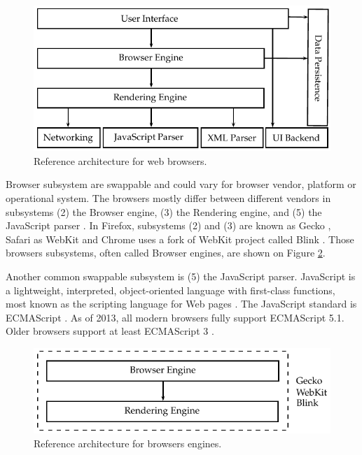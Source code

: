 \begin{figure}[!htb]
  \centering
  \includegraphics{chapters/basic_concepts/web_architecture.pdf}
  \caption{Reference architecture for web browsers.}
  \label{figure:web_architecture}
\end{figure}

Browser subsystem are swappable \cite{Grosskurth2005} and could vary for browser vendor, platform or operational system. The browsers mostly differ between different vendors in subsystems (2) the Browser engine, (3) the Rendering engine, and (5) the JavaScript parser  \cite{Firefox2013,Safari2013,WebKit2013,Chrome2010}. In Firefox, subsystems (2) and (3) are known as Gecko \cite{Firefox2013,Gecko2013}, Safari as WebKit \cite{Safari2013,WebKit2013} and Chrome uses a fork of WebKit project called Blink \cite{Chrome2010,Blink2013}. Those browsers subsystems, often called Browser engines, are shown on Figure \ref{figure:web_architecture_engines}.

Another common swappable subsystem is (5) the JavaScript parser. JavaScript \cite{International2009} is a lightweight, interpreted, object-oriented language with first-class functions, most known as the scripting language for Web pages \cite{Gecko2013}. The JavaScript standard is ECMAScript \cite{Gecko2013,International2009}. As of 2013, all modern browsers fully support ECMAScript 5.1. Older browsers support at least ECMAScript 3 \cite{Gecko2013,International2009}.

\begin{figure}[!htb]
  \centering
  \includegraphics{chapters/basic_concepts/web_architecture_engines.pdf}
  \caption{Reference architecture for browsers engines.}
  \label{figure:web_architecture_engines}
\end{figure}

